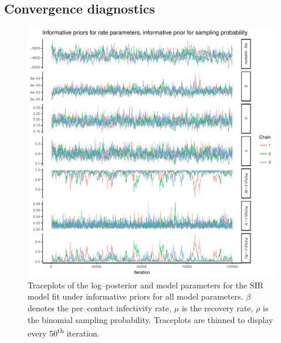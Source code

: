 \subsection{Convergence diagnostics}
\begin{figure}[htbp]
	\centering
	\includegraphics[width=0.9\linewidth]{figures/informative_informative_traceplots.pdf}
	\caption{Traceplots of the log--posterior and model parameters for the SIR model fit under informative priors for all model parameters. $ \beta $ denotes the per--contact infectivity rate, $ \mu $ is the recovery rate, $ \rho $ is the binomial sampling probability. Traceplots are thinned to display every 50\textsuperscript{th} iteration.}
	\label{fig:inform_inform_traces}
\end{figure}

